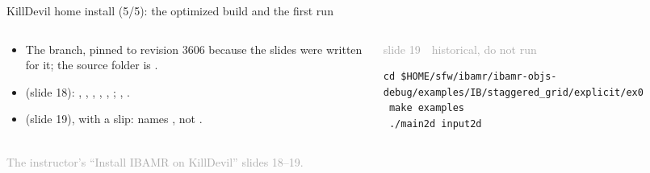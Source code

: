 \documentclass[aspectratio=169,11pt]{beamer}
\newcommand{\sourcecredit}[1]{\vfill\begin{flushright}\tiny\textcolor{DarkGray}{#1}\end{flushright}}
\newcommand{\hist}[1]{{\tiny\sffamily\textcolor{DarkGray}{#1\ \textbullet\ historical, do not run}}\par\nointerlineskip\vspace{0.3mm}}
\begin{document}
\begin{frame}[fragile]{KillDevil home install (5/5): the optimized build and the first run}
\label{fr:kd5}
\begin{columns}[T,onlytextwidth]
\begin{column}{0.5\textwidth}
\small
\begin{itemize}\setlength{\itemsep}{2pt}
  \item The  branch, pinned to revision 3606 because the slides were written for it; the source folder is .
  \item {} (slide 18): , , , , , ; , .
  \item {} (slide 19), with a slip:  names , not .
\end{itemize}
\end{column}
\begin{column}{0.47\textwidth}
\hist{slide 19}
\begin{lstlisting}[style=hist]
 cd $HOME/sfw/ibamr/ibamr-objs-debug/examples/IB/staggered_grid/explicit/ex0
 make examples
 ./main2d input2d
\end{lstlisting}
\end{column}
\end{columns}
\sourcecredit{The instructor's ``Install IBAMR on KillDevil'' slides 18--19.}
\end{frame}
\end{document}
